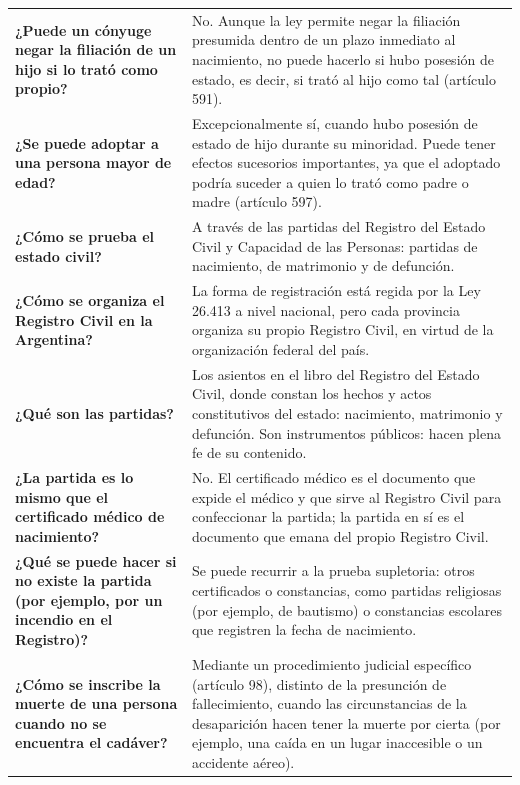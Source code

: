 \documentclass[12pt,oneside]{book}
\begin{document}
\begin{longtable}{
    >{\raggedright\arraybackslash}p{}
    >{\raggedright\arraybackslash}p{}
}
\textbf{¿Puede un cónyuge negar la filiación de un hijo si lo trató como propio?} &
No. Aunque la ley permite negar la filiación presumida dentro de un plazo inmediato al nacimiento, no puede hacerlo si hubo posesión de estado, es decir, si trató al hijo como tal (artículo 591). \\

\textbf{¿Se puede adoptar a una persona mayor de edad?} &
Excepcionalmente sí, cuando hubo posesión de estado de hijo durante su minoridad. Puede tener efectos sucesorios importantes, ya que el adoptado podría suceder a quien lo trató como padre o madre (artículo 597). \\

\textbf{¿Cómo se prueba el estado civil?} &
A través de las partidas del Registro del Estado Civil y Capacidad de las Personas: partidas de nacimiento, de matrimonio y de defunción. \\

\textbf{¿Cómo se organiza el Registro Civil en la Argentina?} &
La forma de registración está regida por la Ley 26.413 a nivel nacional, pero cada provincia organiza su propio Registro Civil, en virtud de la organización federal del país. \\

\textbf{¿Qué son las partidas?} &
Los asientos en el libro del Registro del Estado Civil, donde constan los hechos y actos constitutivos del estado: nacimiento, matrimonio y defunción. Son instrumentos públicos: hacen plena fe de su contenido. \\

\textbf{¿La partida es lo mismo que el certificado médico de nacimiento?} &
No. El certificado médico es el documento que expide el médico y que sirve al Registro Civil para confeccionar la partida; la partida en sí es el documento que emana del propio Registro Civil. \\

\textbf{¿Qué se puede hacer si no existe la partida (por ejemplo, por un incendio en el Registro)?} &
Se puede recurrir a la prueba supletoria: otros certificados o constancias, como partidas religiosas (por ejemplo, de bautismo) o constancias escolares que registren la fecha de nacimiento. \\

\textbf{¿Cómo se inscribe la muerte de una persona cuando no se encuentra el cadáver?} &
Mediante un procedimiento judicial específico (artículo 98), distinto de la presunción de fallecimiento, cuando las circunstancias de la desaparición hacen tener la muerte por cierta (por ejemplo, una caída en un lugar inaccesible o un accidente aéreo). \\


\end{longtable}
\end{document}
